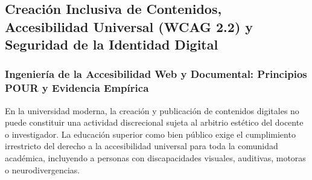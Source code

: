 \subsection{Creación Inclusiva de Contenidos, Accesibilidad Universal (WCAG 2.2) y Seguridad de la Identidad Digital}

\subsubsection{Ingeniería de la Accesibilidad Web y Documental: Principios POUR y Evidencia Empírica}

En la universidad moderna, la creación y publicación de contenidos digitales no puede constituir una actividad discrecional sujeta al arbitrio estético del docente o investigador. La educación superior como bien público exige el cumplimiento irrestricto del derecho a la accesibilidad universal para toda la comunidad académica, incluyendo a personas con discapacidades visuales, auditivas, motoras o neurodivergencias.


